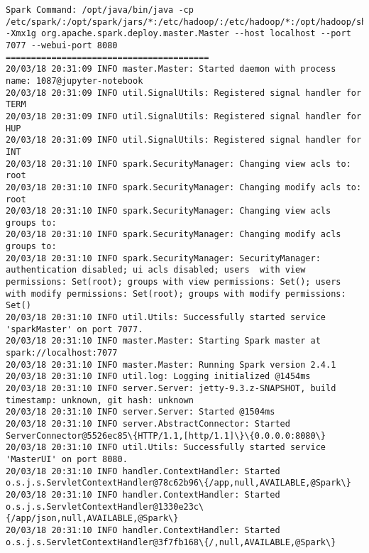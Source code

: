 \documentclass[11pt]{article}
\begin{document}
    \begin{Verbatim}[commandchars=\\\{\}]
Spark Command: /opt/java/bin/java -cp /etc/spark/:/opt/spark/jars/*:/etc/hadoop/:/etc/hadoop/*:/opt/hadoop/share/hadoop/common/lib/*:/opt/hadoop/share/hadoop/common/*:/opt/hadoop/share/hadoop/hdfs/*:/opt/hadoop/share/hadoop/hdfs/lib/*:/opt/hadoop/share/hadoop/yarn/lib/*:/opt/hadoop/share/hadoop/yarn/*:/opt/hadoop/share/hadoop/mapreduce/lib/*:/opt/hadoop/share/hadoop/mapreduce/*:/opt/hadoop/share/hadoop/tools/lib/* -Xmx1g org.apache.spark.deploy.master.Master --host localhost --port 7077 --webui-port 8080
========================================
20/03/18 20:31:09 INFO master.Master: Started daemon with process name: 1087@jupyter-notebook
20/03/18 20:31:09 INFO util.SignalUtils: Registered signal handler for TERM
20/03/18 20:31:09 INFO util.SignalUtils: Registered signal handler for HUP
20/03/18 20:31:09 INFO util.SignalUtils: Registered signal handler for INT
20/03/18 20:31:10 INFO spark.SecurityManager: Changing view acls to: root
20/03/18 20:31:10 INFO spark.SecurityManager: Changing modify acls to: root
20/03/18 20:31:10 INFO spark.SecurityManager: Changing view acls groups to: 
20/03/18 20:31:10 INFO spark.SecurityManager: Changing modify acls groups to: 
20/03/18 20:31:10 INFO spark.SecurityManager: SecurityManager: authentication disabled; ui acls disabled; users  with view permissions: Set(root); groups with view permissions: Set(); users  with modify permissions: Set(root); groups with modify permissions: Set()
20/03/18 20:31:10 INFO util.Utils: Successfully started service 'sparkMaster' on port 7077.
20/03/18 20:31:10 INFO master.Master: Starting Spark master at spark://localhost:7077
20/03/18 20:31:10 INFO master.Master: Running Spark version 2.4.1
20/03/18 20:31:10 INFO util.log: Logging initialized @1454ms
20/03/18 20:31:10 INFO server.Server: jetty-9.3.z-SNAPSHOT, build timestamp: unknown, git hash: unknown
20/03/18 20:31:10 INFO server.Server: Started @1504ms
20/03/18 20:31:10 INFO server.AbstractConnector: Started ServerConnector@5526ec85\{HTTP/1.1,[http/1.1]\}\{0.0.0.0:8080\}
20/03/18 20:31:10 INFO util.Utils: Successfully started service 'MasterUI' on port 8080.
20/03/18 20:31:10 INFO handler.ContextHandler: Started o.s.j.s.ServletContextHandler@78c62b96\{/app,null,AVAILABLE,@Spark\}
20/03/18 20:31:10 INFO handler.ContextHandler: Started o.s.j.s.ServletContextHandler@1330e23c\{/app/json,null,AVAILABLE,@Spark\}
20/03/18 20:31:10 INFO handler.ContextHandler: Started o.s.j.s.ServletContextHandler@3f7fb168\{/,null,AVAILABLE,@Spark\}

\end{Verbatim}
\end{document}
